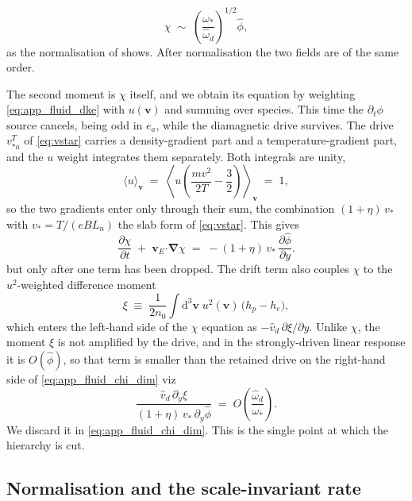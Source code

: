 \documentclass{jpp}
\newcommand{\order}[1]{O\left(#1\right)}
\newcommand{\rmd}{\text{d}}
\newcommand{\bv}{\mathbf{v}}
\renewcommand{\vec}[1]{\boldsymbol{#1}}
\newcommand{\vec}[1]{\boldsymbol{#1}}
\providecommand{\bcdot}{\vec{\cdot}}
\newcommand{\grad}{{\vec{\nabla}}}
\begin{document}
\begin{equation}\label{eq:app_fluid_chi_large}
\chi \;\sim\; \left(\frac{\omega_*}{\hat\omega_d}\right)^{1/2} \hat\phi ,
\end{equation}
as the normalisation of  shows. After normalisation the two fields are of the same order.

The second moment is $\chi$ itself, and we obtain its equation by weighting \cref{eq:app_fluid_dke} with $u(\bv)$ and summing over species. This time the $\partial_t\phi$ source cancels, being odd in $e_a$, while the diamagnetic drive survives. The drive $v_{*a}^T$ of \cref{eq:vstar} carries a density-gradient part and a temperature-gradient part, and the $u$ weight integrates them separately. Both integrals are unity,
\begin{equation}\label{eq:app_fluid_maxwellian}
\bigl\langle u \bigr\rangle_\bv \;=\; \left\langle u\left(\frac{m v^2}{2T} - \frac{3}{2}\right)\right\rangle_\bv \;=\; 1 ,
\end{equation}
so the two gradients enter only through their sum, the combination $(1+\eta)\,v_*$ with $v_* = T/(e B L_n)$ the slab form of \cref{eq:vstar}. This gives
\begin{equation}\label{eq:app_fluid_chi_dim}
\frac{\partial \chi}{\partial t} \;+\; \vec{v}_E\bcdot\grad\chi \;=\; -(1+\eta)\,v_*\,\frac{\partial \hat\phi}{\partial y}.
\end{equation}
but only after one term has been dropped. The drift term also couples $\chi$ to the $u^2$-weighted difference moment
\begin{equation}\label{eq:app_fluid_xi_def}
\xi \;\equiv\; \frac{1}{2 n_0}\int \rmd^3\bv\; u^2(\bv)\,\bigl(h_p - h_e\bigr),
\end{equation}
which enters the left-hand side of the $\chi$ equation as $-\hat{v}_d\,\partial\xi/\partial y$. Unlike $\chi$, the moment $\xi$ is not amplified by the drive, and in the strongly-driven linear response it is $\order{\hat\phi}$, so that term is smaller than the retained drive on the right-hand side of \cref{eq:app_fluid_chi_dim} viz
\begin{equation}\label{eq:app_fluid_xi_small}
\frac{\hat{v}_d\,\partial_y \xi}{(1+\eta)\,v_*\,\partial_y \hat\phi} \;=\; \order{\frac{\hat\omega_d}{\omega_*}} .
\end{equation}
We discard it in \cref{eq:app_fluid_chi_dim}. This is the single point at which the hierarchy is cut.

\subsection{Normalisation and the scale-invariant rate}\label{sec:app_fluid_norm}
\end{document}
